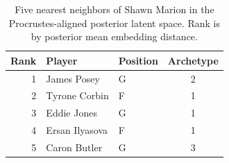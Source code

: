 \begin{table}[htbp]
  \centering\small
  \begin{tabular}{rllc}
    \toprule
    Rank & Player & Position & Archetype \\
    \midrule
    1 & James Posey & G & 2 \\
    2 & Tyrone Corbin & F & 1 \\
    3 & Eddie Jones & G & 1 \\
    4 & Ersan Ilyasova & F & 1 \\
    5 & Caron Butler & G & 3 \\
    \bottomrule
  \end{tabular}
  \caption{Five nearest neighbors of Shawn Marion in the Procrustes-aligned posterior latent space. Rank is by posterior mean embedding distance.}
  \label{tab:Shawn_Marion_neighbors}
\end{table}

